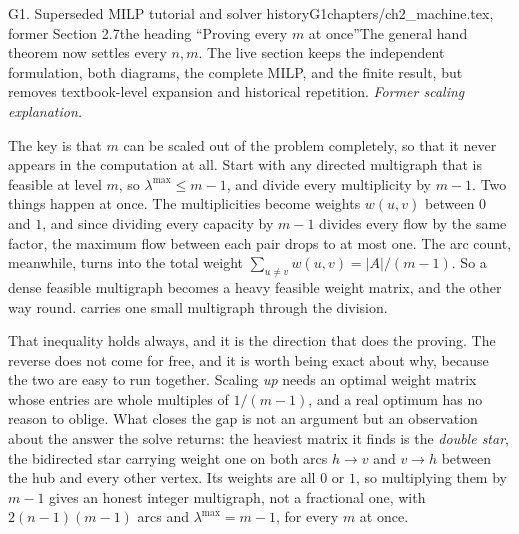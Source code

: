 \begin{offcutrewrite}{G1. Superseded MILP tutorial and solver history}{G1}{chapters/ch2\_machine.tex, former Section 2.7}{the heading ``Proving every $m$ at once''}{The general hand theorem now settles every $n,m$. The live section keeps the independent formulation, both diagrams, the complete MILP, and the finite result, but removes textbook-level expansion and historical repetition.}
\noindent\emph{Former scaling explanation.}

The key is that $m$ can be scaled out of the problem completely, so that it never appears in the computation at all. Start with any directed multigraph that is feasible at level $m$, so $\lambda^{\max} \le m - 1$, and divide every multiplicity by $m - 1$. Two things happen at once. The multiplicities become weights $w(u, v)$ between $0$ and $1$, and since dividing every capacity by $m - 1$ divides every flow by the same factor, the maximum flow between each pair drops to at most one. The arc count, meanwhile, turns into the total weight $\sum_{u \ne v} w(u, v) = |A| / (m - 1)$. So a dense feasible multigraph becomes a heavy feasible weight matrix, and the other way round.  carries one small multigraph through the division.

That inequality holds always, and it is the direction that does the proving. The reverse does not come for free, and it is worth being exact about why, because the two are easy to run together. Scaling \emph{up} needs an optimal weight matrix whose entries are whole multiples of $1/(m-1)$, and a real optimum has no reason to oblige. What closes the gap is not an argument but an observation about the answer the solve returns: the heaviest matrix it finds is the \emph{double star}, the bidirected star carrying weight one on both arcs $h \to v$ and $v \to h$ between the hub and every other vertex. Its weights are all $0$ or $1$, so multiplying them by $m - 1$ gives an honest integer multigraph, not a fractional one, with $2(n-1)(m-1)$ arcs and $\lambda^{\max} = m - 1$, for every $m$ at once.


\end{offcutrewrite}
